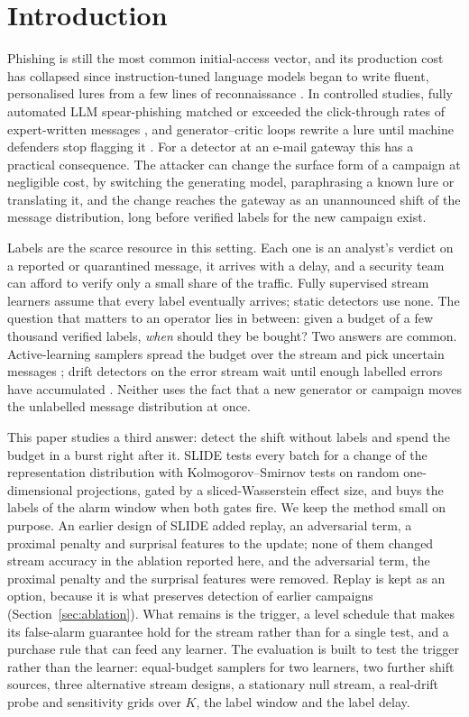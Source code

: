\section{Introduction}\label{sec:intro}

Phishing is still the most common initial-access vector, and its production cost has collapsed since instruction-tuned language models began to write fluent, personalised lures from a few lines of reconnaissance \cite{heiding2024,hazell2023}. In controlled studies, fully automated LLM spear-phishing matched or exceeded the click-through rates of expert-written messages \cite{heiding2026,bethany2025}, and generator--critic loops rewrite a lure until machine defenders stop flagging it \cite{qi2025}. For a detector at an e-mail gateway this has a practical consequence. The attacker can change the surface form of a campaign at negligible cost, by switching the generating model, paraphrasing a known lure or translating it, and the change reaches the gateway as an unannounced shift of the message distribution, long before verified labels for the new campaign exist.

Labels are the scarce resource in this setting. Each one is an analyst's verdict on a reported or quarantined message, it arrives with a delay, and a security team can afford to verify only a small share of the traffic. Fully supervised stream learners assume that every label eventually arrives; static detectors use none. The question that matters to an operator lies in between: given a budget of a few thousand verified labels, \emph{when} should they be bought? Two answers are common. Active-learning samplers spread the budget over the stream and pick uncertain messages \cite{zliobaite2014,escudero2025}; drift detectors on the error stream wait until enough labelled errors have accumulated \cite{bifet2007}. Neither uses the fact that a new generator or campaign moves the unlabelled message distribution at once.

This paper studies a third answer: detect the shift without labels and spend the budget in a burst right after it. SLIDE tests every batch for a change of the representation distribution with Kolmogorov--Smirnov tests on random one-dimensional projections, gated by a sliced-Wasserstein effect size, and buys the labels of the alarm window when both gates fire. We keep the method small on purpose. An earlier design of SLIDE added replay, an adversarial term, a proximal penalty and surprisal features to the update; none of them changed stream accuracy in the ablation reported here, and the adversarial term, the proximal penalty and the surprisal features were removed. Replay is kept as an option, because it is what preserves detection of earlier campaigns (Section~\ref{sec:ablation}). What remains is the trigger, a level schedule that makes its false-alarm guarantee hold for the stream rather than for a single test, and a purchase rule that can feed any learner. The evaluation is built to test the trigger rather than the learner: equal-budget samplers for two learners, two further shift sources, three alternative stream designs, a stationary null stream, a real-drift probe and sensitivity grids over $K$, the label window and the label delay.


